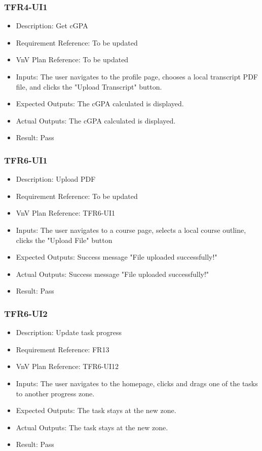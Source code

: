 \documentclass[12pt, titlepage]{article}
\begin{document}
\subsubsection{TFR4-UI1}\label{3.2.6}
\begin{itemize}
    \item Description: Get cGPA
    \item Requirement Reference: To be updated
    \item VnV Plan Reference: To be updated
    \item Inputs: The user navigates to the profile page, chooses a local transcript PDF file, and clicks the "Upload Transcript" button.
    \item Expected Outputs: The cGPA calculated is displayed.
    \item Actual Outputs: The cGPA calculated is displayed.
    \item Result: Pass
\end{itemize}


\subsubsection{TFR6-UI1}\label{3.2.7}
\begin{itemize}
    \item Description: Upload PDF
    \item Requirement Reference: To be updated
    \item VnV Plan Reference: TFR6-UI1
    \item Inputs: The user navigates to a course page, selects a local course outline, clicks the "Upload File" button
    \item Expected Outputs: Success message "File uploaded successfully!"
    \item Actual Outputs: Success message "File uploaded successfully!"
    \item Result: Pass
\end{itemize}

\subsubsection{TFR6-UI2}\label{3.2.8}
\begin{itemize}
    \item Description: Update task progress
    \item Requirement Reference: FR13
    \item VnV Plan Reference: TFR6-UI12
    \item Inputs: The user navigates to the homepage, clicks and drags one of the tasks to another progress zone.
    \item Expected Outputs: The task stays at the new zone.
    \item Actual Outputs: The task stays at the new zone.
    \item Result: Pass
\end{itemize}
\end{document}
